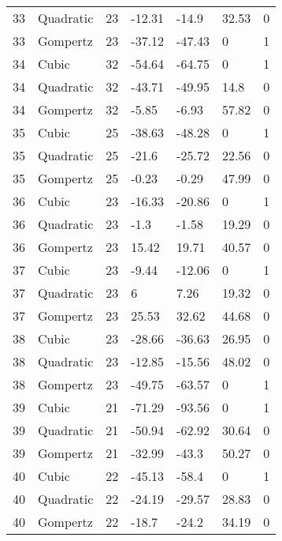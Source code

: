 \documentclass[11pt]{article}
\begin{document}
\begin{center}
\begin{longtable}{lllllll}
    33  & Quadratic & 23              & -12.31  & -14.9   & 32.53   & 0    \\
    33  & Gompertz  & 23              & -37.12  & -47.43  & 0       & 1    \\
    34  & Cubic     & 32              & -54.64  & -64.75  & 0       & 1    \\
    34  & Quadratic & 32              & -43.71  & -49.95  & 14.8    & 0    \\
    34  & Gompertz  & 32              & -5.85   & -6.93   & 57.82   & 0    \\
    35  & Cubic     & 25              & -38.63  & -48.28  & 0       & 1    \\
    35  & Quadratic & 25              & -21.6   & -25.72  & 22.56   & 0    \\
    35  & Gompertz  & 25              & -0.23   & -0.29   & 47.99   & 0    \\
    36  & Cubic     & 23              & -16.33  & -20.86  & 0       & 1    \\
    36  & Quadratic & 23              & -1.3    & -1.58   & 19.29   & 0    \\
    36  & Gompertz  & 23              & 15.42   & 19.71   & 40.57   & 0    \\
    37  & Cubic     & 23              & -9.44   & -12.06  & 0       & 1    \\
    37  & Quadratic & 23              & 6       & 7.26    & 19.32   & 0    \\
    37  & Gompertz  & 23              & 25.53   & 32.62   & 44.68   & 0    \\
    38  & Cubic     & 23              & -28.66  & -36.63  & 26.95   & 0    \\
    38  & Quadratic & 23              & -12.85  & -15.56  & 48.02   & 0    \\
    38  & Gompertz  & 23              & -49.75  & -63.57  & 0       & 1    \\
    39  & Cubic     & 21              & -71.29  & -93.56  & 0       & 1    \\
    39  & Quadratic & 21              & -50.94  & -62.92  & 30.64   & 0    \\
    39  & Gompertz  & 21              & -32.99  & -43.3   & 50.27   & 0    \\
    40  & Cubic     & 22              & -45.13  & -58.4   & 0       & 1    \\
    40  & Quadratic & 22              & -24.19  & -29.57  & 28.83   & 0    \\
    40  & Gompertz  & 22              & -18.7   & -24.2   & 34.19   & 0    \\

\end{longtable}
\end{center}
\end{document}
